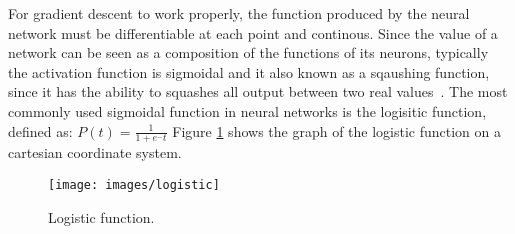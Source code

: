 
For gradient descent to work properly, the function produced by the neural network must be
differentiable at each point and continous. 
Since the value of a network can be seen as a composition of the
functions of its neurons, typically the activation function is sigmoidal and it also known as a sqaushing function, since it has the ability to squashes all output between two real values~\cite{mitchell1997}.
The most commonly used sigmoidal function in neural networks is the logisitic function, defined as:
$P(t) = \frac{1}{1 + e^-t}$
Figure \ref{logistic} shows the graph of the logistic function on a cartesian coordinate system.

\begin{figure}[h!]
  \centering
  \texttt{[image: images/logistic]}
  \caption{Logistic function.}
  \label{logistic}
\end{figure}



